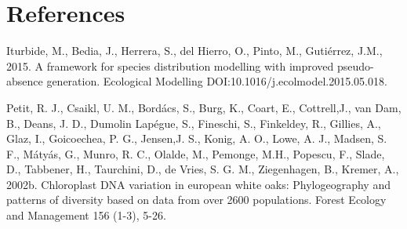 \documentclass[10pt,a4paper]{article}
\begin{document}
\section{References}

Iturbide, M., Bedia, J., Herrera, S., del Hierro, O., Pinto, M., Guti\'errez, J.M., 2015. A framework for
species distribution modelling with improved pseudo-absence generation. Ecological Modelling DOI:10.1016/j.ecolmodel.2015.05.018.

 
 Petit, R. J., Csaikl, U. M., Bord\'acs, S., Burg, K., Coart, E., Cottrell,J., van Dam, B., Deans, J. D., Dumolin Lap\'egue, S., Fineschi, S., Finkeldey, R., Gillies, A., Glaz, I., Goicoechea, P. G., Jensen,J. S., Konig, A. O., Lowe, A. J., Madsen, S. F., M\'aty\'as, G., Munro, R. C., Olalde, M., Pemonge, M.H., Popescu, F., Slade, D., Tabbener, H., Taurchini, D., de Vries, S. G. M., Ziegenhagen, B., Kremer, A., 2002b. Chloroplast DNA variation in european white oaks: Phylogeography and patterns of diversity based on data from over 2600 populations. Forest Ecology and Management 156 (1-3), 5-26.
\end{document}
